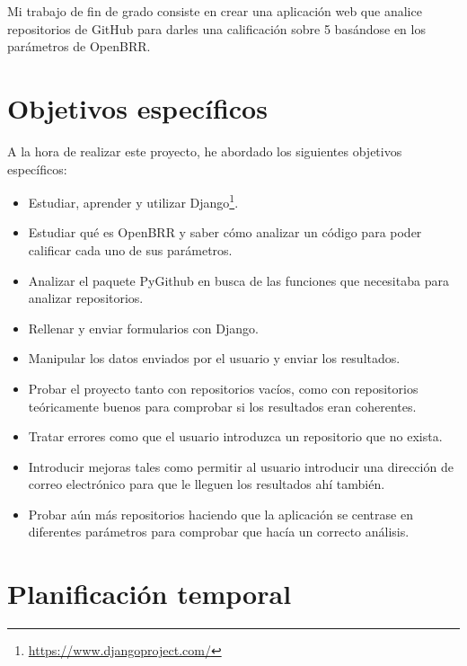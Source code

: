 \documentclass[a4paper, 12pt]{book}
\begin{document}
Mi trabajo de fin de grado consiste en crear una aplicación web que analice repositorios de GitHub para darles una calificación sobre 5 basándose en los parámetros de OpenBRR.


\section{Objetivos específicos}
\label{sec:objetivos-especificos}

A la hora de realizar este proyecto, he abordado los siguientes objetivos específicos:

\begin{itemize}
	\item Estudiar, aprender y utilizar Django\footnote{\url{https://www.djangoproject.com/}}.

	\item Estudiar qué es OpenBRR y saber cómo analizar un código para poder calificar cada uno de sus parámetros.
	
	\item Analizar el paquete PyGithub en busca de las funciones que necesitaba para analizar repositorios.

	\item Rellenar y enviar formularios con Django.

	\item Manipular los datos enviados por el usuario y enviar los resultados.

	\item Probar el proyecto tanto con repositorios vacíos, como con repositorios teóricamente buenos para comprobar si los resultados eran coherentes.

	\item Tratar errores como que el usuario introduzca un repositorio que no exista.

	\item Introducir mejoras tales como permitir al usuario introducir una dirección de correo electrónico para que le lleguen los resultados ahí también.

	\item Probar aún más repositorios haciendo que la aplicación se centrase en diferentes parámetros para comprobar que hacía un correcto análisis.
\end{itemize}


\section{Planificación temporal}
\label{sec:planificacion-temporal}
\end{document}
